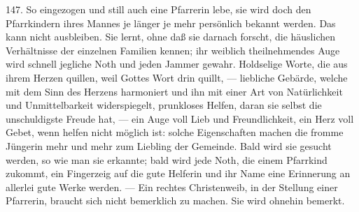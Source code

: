 147. So eingezogen und still auch eine Pfarrerin lebe, sie wird doch den Pfarrkindern ihres Mannes je länger je mehr persönlich bekannt werden. Das kann nicht ausbleiben. Sie lernt, ohne daß sie darnach forscht, die häuslichen Verhältnisse der einzelnen Familien kennen; ihr weiblich theilnehmendes Auge wird schnell jegliche Noth und jeden Jammer gewahr. Holdselige Worte, die aus ihrem Herzen quillen, weil Gottes Wort drin quillt, — liebliche Gebärde, welche mit dem Sinn des Herzens harmoniert und ihn mit einer Art von Natürlichkeit und Unmittelbarkeit widerspiegelt, prunkloses Helfen, daran sie selbst die unschuldigste Freude hat, — ein Auge voll Lieb und Freundlichkeit, ein Herz voll Gebet, wenn helfen nicht möglich ist: solche Eigenschaften machen die fromme Jüngerin mehr und mehr zum Liebling der Gemeinde. Bald wird sie gesucht werden, so wie man sie erkannte; bald wird jede Noth, die einem Pfarrkind zukommt, ein Fingerzeig auf die gute Helferin und ihr Name eine Erinnerung an allerlei gute Werke werden. — Ein rechtes Christenweib, in der Stellung einer Pfarrerin, braucht sich nicht bemerklich zu machen. Sie wird ohnehin bemerkt.

